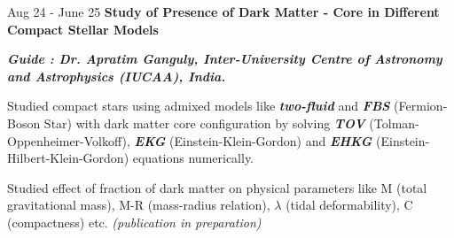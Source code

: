 \begin{onecolentry}
\begin{highlights}
            \end{highlights}        
        \end{onecolentry}
        
        \vspace{0.2 cm}
        \begin{twocolentry}{
            Aug 24 - June 25
        }
            \textbf{Study of Presence of Dark Matter - Core in Different Compact Stellar Models} \end{twocolentry}

        \vspace{0.10 cm}
        \begin{onecolentry}
            \textbf{\textit{Guide : Dr. Apratim Ganguly, Inter-University Centre of Astronomy and Astrophysics (IUCAA), India.}}\\
            
            \vspace{0.10 cm}
            \begin{highlights}
                \item Studied compact stars using admixed models like \textbf{\textit{two-fluid}} and \textbf{\textit{FBS}} (Fermion-Boson Star) with dark matter core configuration by solving \textbf{\textit{TOV}} (Tolman-Oppenheimer-Volkoff), \textbf{\textit{EKG}} (Einstein-Klein-Gordon) and \textbf{\textit{EHKG}} (Einstein-Hilbert-Klein-Gordon) equations numerically.
                
                \vspace{0.10 cm}
                
                \item Studied effect of fraction of dark matter on physical parameters like M (total gravitational mass), M-R (mass-radius relation), $\lambda$ (tidal deformability), C (compactness) etc. \textit{(publication in preparation)}




\end{highlights}
\end{onecolentry}
